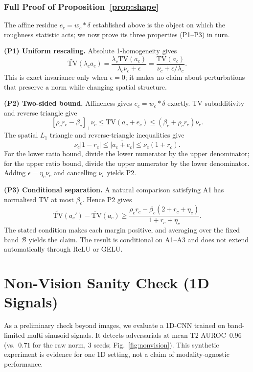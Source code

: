 \documentclass[10pt,letterpaper,journal]{IEEEtran}
\begin{document}
\subsubsection*{Full Proof of Proposition~\ref{prop:shape}}
The affine residue $e_c=w_c\!\ast\delta$ established above is the object on which
the roughness statistic acts; we now prove its three properties (P1--P3) in turn.

\noindent\textbf{(P1) Uniform rescaling.} Absolute 1-homogeneity gives
\[
\widetilde{\mathrm{TV}}(\lambda_c a_c)
=\frac{\lambda_c\mathrm{TV}(a_c)}{\lambda_c\nu_c+\epsilon}
=\frac{\mathrm{TV}(a_c)}{\nu_c+\epsilon/\lambda_c}.
\]
This is exact invariance only when $\epsilon=0$; it makes no claim about
perturbations that preserve a norm while changing spatial structure.

\textbf{(P2) Two-sided bound.} Affineness gives
$e_c=w_c\!\ast\delta$ exactly. TV subadditivity and reverse triangle give
\[
[\rho_c r_c-\beta_c]_+\nu_c
\le \mathrm{TV}(a_c+e_c)
\le(\beta_c+\rho_c r_c)\nu_c.
\]
The spatial $L_1$ triangle and reverse-triangle inequalities give
\[
\nu_c|1-r_c|\le\overline{|a_c+e_c|}
\le\nu_c(1+r_c).
\]
For the lower ratio bound, divide the lower numerator by the upper denominator;
for the upper ratio bound, divide the upper numerator by the lower denominator.
Adding $\epsilon=\eta_c\nu_c$ and cancelling $\nu_c$ yields P2.

\textbf{(P3) Conditional separation.} A natural comparison satisfying A1 has
normalised TV at most $\beta_c$. Hence P2 gives
\[
\widetilde{\mathrm{TV}}(a_c')-\widetilde{\mathrm{TV}}(a_c)
\ge
\frac{\rho_c r_c-\beta_c(2+r_c+\eta_c)}
     {1+r_c+\eta_c}.
\]
The stated condition makes each margin positive, and averaging over the fixed
band $\mathcal B$ yields the claim. The result is conditional on A1--A3 and
does not extend automatically through ReLU or GELU.





\section{Non-Vision Sanity Check (1D Signals)}
\label{app:nonvision}
As a preliminary check beyond images, we evaluate a 1D-CNN trained on
band-limited multi-sinusoid signals. It detects adversarials at mean T2
AUROC~$\mathbf{0.96}$ (vs.\ $0.71$ for the raw norm, 3 seeds;
Fig.~\ref{fig:nonvision}). This synthetic experiment is evidence for one 1D
setting, not a claim of modality-agnostic performance.
\end{document}

